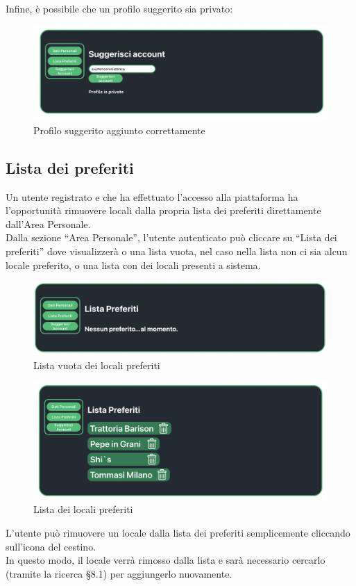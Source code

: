 Infine, è possibile che un profilo suggerito sia privato:

\begin{figure}[H]
\centering
\includegraphics[scale=0.4]{./images/AreaPersonale/ProfiloPrivato.png} 
\caption{Profilo suggerito aggiunto correttamente}
\end{figure}

\subsection{Lista dei preferiti}

Un utente registrato e che ha effettuato l’accesso alla piattaforma ha l’opportunità rimuovere locali dalla propria lista dei preferiti direttamente dall'Area Personale. \\

Dalla sezione “Area Personale”, l’utente autenticato può cliccare su “Lista dei preferiti” dove visualizzerà o una lista vuota, nel caso nella lista non ci sia alcun locale preferito, o una lista con dei locali presenti a sistema.

\begin{figure}[H]
\centering
\includegraphics[scale=0.4]{./images/AreaPersonale/ListaPreferiti.png} 
\caption{Lista vuota dei locali preferiti}
\end{figure}

\begin{figure}[H]
\centering
\includegraphics[scale=0.4]{./images/AreaPersonale/ListaPreferiti2.png} 
\caption{Lista dei locali preferiti}
\end{figure}

L’utente può rimuovere un locale dalla lista dei preferiti semplicemente cliccando sull’icona del cestino. \\

In questo modo, il locale verrà rimosso dalla lista e sarà necessario cercarlo (tramite la ricerca \S{8.1}) per aggiungerlo nuovamente. 
